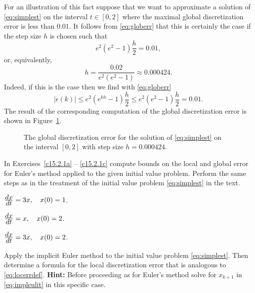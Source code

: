 \documentclass{ximera}
\begin{document}
For an illustration of this fact suppose that we want to approximate 
a solution of \eqref{eq:simplest} on the interval $t\in [0,2]$
where the maximal global discretization 
error is less than $0.01$.
It follows from \eqref{eq:globerr} that this is certainly the case if the
step size $h$ is chosen such that
\[
e^2(e^2-1)\frac{h}{2} = 0.01,
\]
or, equivalently,
\[
h = \frac{0.02}{e^2(e^2-1)} \approx 0.000424.
\]
Indeed, if this is the case then we find  with \eqref{eq:globerr}
\[
|\epsilon(k)| \le e^2(e^{kh}-1)\frac{h}{2} \le e^2(e^2-1)\frac{h}{2} = 0.01.
\]
The result of the corresponding \Matlab computation of the global
discretization error is shown in Figure~\ref{fig:globerr2}.
\begin{figure}[htb]
   \centerline{%
   }
   \caption{The global discretization error for the solution of
   \protect\eqref{eq:simplest} on the interval $[0,2]$ with
   step size $h=0.000424$.}
   \label{fig:globerr2}
\end{figure}



\EXER

\TEXER

\noindent In Exercises~\ref{c15.2.1a} -- \ref{c15.2.1c} compute
bounds on the local and global error for Euler's method applied
to the given initial value problem.  Perform the same steps as in
the treatment of the initial value problem \eqref{eq:simplest} in
the text.
\begin{exercise} \label{c15.2.1a}
$\frac{\displaystyle dx}{\displaystyle dt} = 3x,\quad x(0)=1$.
\end{exercise}
\begin{exercise} \label{c15.2.1b}
$\frac{\displaystyle dx}{\displaystyle dt} = x,\quad x(0)=2$.
\end{exercise}
\begin{exercise} \label{c15.2.1c}
$\frac{\displaystyle dx}{\displaystyle dt} = 3x,\quad x(0)=2$.
\end{exercise}

\begin{exercise} \label{c15.2.2}
Apply the implicit Euler method to the initial value problem
\eqref{eq:simplest}.  Then determine a formula for the local 
discretization error that is analogous to \eqref{eq:locerrdef}.
{\bf Hint:} Before proceeding as for Euler's method solve
for $x_{k+1}$ in \eqref{eq:impleulit} in this specific case.
\end{exercise}

\CEXER
\end{document}
